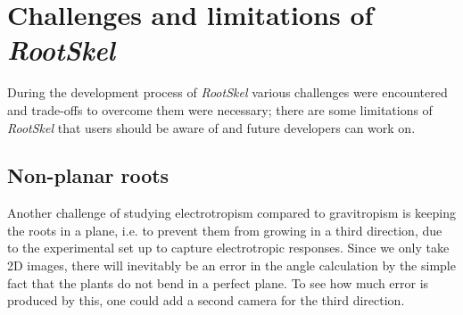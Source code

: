 


\section{Challenges and limitations of \textit{RootSkel}}

During the development process of \textit{RootSkel} various challenges were encountered and trade-offs to overcome them were necessary; there are some limitations of \textit{RootSkel} that users should be aware of and future developers can work on.


\subsection{Non-planar roots}

Another challenge of studying electrotropism compared to gravitropism %
is keeping the roots in a plane, i.e. to prevent them from growing in a third direction, due to the experimental set up to capture electrotropic responses. Since we only take 2D images, there will inevitably be an error in the angle calculation by the simple fact that the plants do not bend in a perfect plane.
To see how much error is produced by this, one could add a second camera for the third direction.


